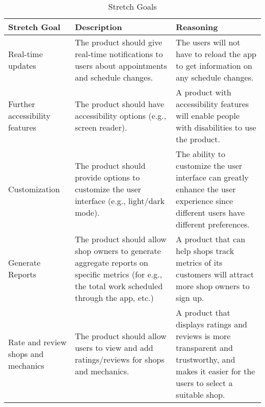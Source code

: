 \documentclass{article}
\begin{document}
\begin{center}
    \begin{longtable}{ | p{3cm} | p{4cm} | p{4.5cm} |}
    \caption{Stretch Goals}
    \label{tab:stretchGoals}
    \\ \hline
    \textbf{Stretch Goal} & \textbf{Description} & \textbf{Reasoning} \\ \hline
    Real-time updates & 
    The product should give real-time notifications to users about appointments and schedule changes. &  
    The users will not have to reload the app to get information on any schedule changes.
\\ \hline

    Further accessibility features & 
    The product should have accessibility options (e.g., screen reader).  &  
    A product with accessibility features will enable people with disabilities to use the product.
\\ \hline

    Customization & 
    The product should provide options to customize the user interface (e.g., light/dark mode).  &  
    The ability to customize the user interface can greatly enhance the user experience since different users have different preferences.
\\ \hline

    Generate Reports & 
    The product should allow shop owners to generate aggregate reports on specific metrics (for e.g., the total work scheduled through the app, etc.)   &  
    A product that can help shops track metrics of its customers will attract more shop owners to sign up.
\\ \hline

    Rate and review shops and mechanics & 
    The product should allow users to view and add ratings/reviews for shops and mechanics.  &  
    A product that displays ratings and reviews is more transparent and trustworthy, and makes it easier for the users to select a suitable shop.
    \\ \hline
    \end{longtable}
\end{center}
\end{document}
